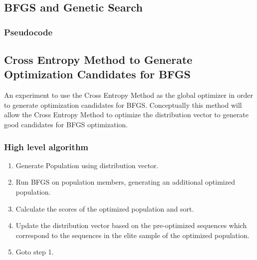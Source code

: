\documentclass[11pt]{article}
\begin{document}
    \subsection{BFGS and Genetic Search}
    \subsubsection{Pseudocode}
    

    \clearpage
    \subsection{Cross Entropy Method to Generate Optimization Candidates for BFGS}
    \par An experiment to use the Cross Entropy Method as the global optimizer in order to generate optimization candidates for BFGS. Conceptually this method will allow the Cross Entropy Method to optimize the distribution vector to generate good candidates for BFGS optimization.
    \subsubsection{High level algorithm}
    \begin{enumerate}
        \item Generate Population using distribution vector.
        \item Run BFGS on population members, generating an additional optimized population.
        \item Calculate the scores of the optimized population and sort.
        \item Update the distribution vector based on the pre-optimized sequences which correspond to the sequences in the elite sample of the optimized population.
        \item Goto step 1.
    \end{enumerate}
    
    
    
    
\end{document}
